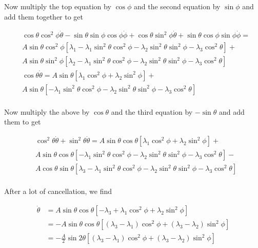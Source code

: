 \documentclass[extra,onecolumn]{gji}
\begin{document}
Now multiply the top equation by $\cos{\phi}$ and the second equation by $\sin{\phi}$ and add them together to get

\begin{equation}
\begin{aligned}
 & \cos{\theta}\cos^2{\phi} \dot{\theta}  - \sin{\theta}\sin{\phi} \cos{\phi} \dot{\phi} + \cos{\theta}\sin^2{\phi} \dot{\theta}  + \sin{\theta}\cos{\phi} \sin{\phi} \dot{\phi} = \\
  &A \sin{\theta}\cos^2{\phi}\left[ \lambda_1 - \lambda_1 \sin^2{\theta}\cos^2{\phi} - \lambda_2 \sin^2{\theta}\sin^2{\phi} - \lambda_3 \cos^2{\theta} \right] + \\
  &A \sin{\theta}\sin^2{\phi} \left[ \lambda_2 - \lambda_1 \sin^2{\theta}\cos^2{\phi} - \lambda_2 \sin^2{\theta}\sin^2{\phi} - \lambda_3 \cos^2{\theta} \right] \\
 & \cos{\theta}\dot{\theta} =  
   A \sin{\theta} \left[ \lambda_1 \cos^2{\phi} +  \lambda_2 \sin^2{\phi} \right] + \\
  &A \sin{\theta} \left[ - \lambda_1 \sin^2{\theta}\cos^2{\phi} - \lambda_2 \sin^2{\theta}\sin^2{\phi} - \lambda_3 \cos^2{\theta} \right] \\
\end{aligned}
\end{equation}

Now multiply the above by $\cos{\theta}$ and the third equation by $-\sin{\theta}$ and add them to get

\begin{equation}
\begin{aligned}
 & \cos^2{\theta}\dot{\theta} + \sin^2{\theta} \dot{\theta} =  
   A \sin{\theta} \cos{\theta} \left[ \lambda_1 \cos^2{\phi} +  \lambda_2 \sin^2{\phi} \right] + \\
  &A \sin{\theta} \cos{\theta} \left[ - \lambda_1 \sin^2{\theta}\cos^2{\phi} - \lambda_2 \sin^2{\theta}\sin^2{\phi} - \lambda_3 \cos^2{\theta} \right] - \\
  &A \cos{\theta} \sin{\theta} \left[ \lambda_3 - \lambda_1 \sin^2{\theta}\cos^2{\phi} - \lambda_2 \sin^2{\theta}\sin^2{\phi} - \lambda_3 \cos^2{\theta} \right] \\
\end{aligned}
\end{equation}

After a lot of cancellation, we find

\begin{equation}
\begin{aligned}
 \dot{\theta} &= A \sin{\theta} \cos{\theta} \left[ - \lambda_3 + \lambda_1 \cos^2{\phi} + \lambda_2 \sin^2{\phi} \right] \\
              &= - A \sin{\theta} \cos{\theta} \left[ (\lambda_3 - \lambda_1) \cos^2{\phi} + (\lambda_3 - \lambda_2) \sin^2{\phi} \right] \\
              &= -\frac{A}{2} \sin{2 \theta} \left[ (\lambda_3 - \lambda_1) \cos^2{\phi} + (\lambda_3 - \lambda_2) \sin^2{\phi} \right] \\
\end{aligned}
\end{equation}
\end{document}
